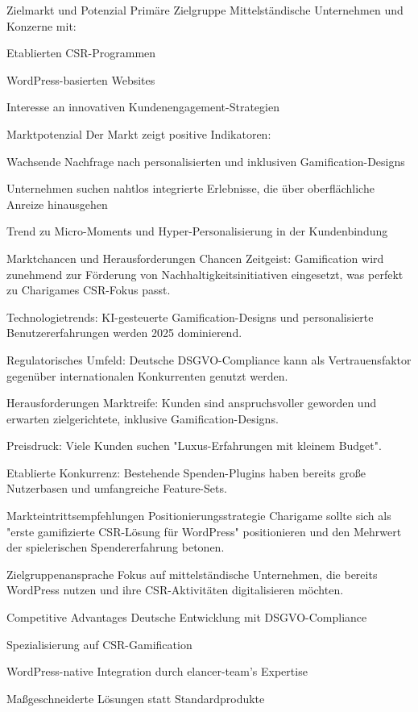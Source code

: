 Zielmarkt und Potenzial
Primäre Zielgruppe
Mittelständische Unternehmen und Konzerne mit:

Etablierten CSR-Programmen

WordPress-basierten Websites

Interesse an innovativen Kundenengagement-Strategien

Marktpotenzial
Der Markt zeigt positive Indikatoren:

Wachsende Nachfrage nach personalisierten und inklusiven Gamification-Designs

Unternehmen suchen nahtlos integrierte Erlebnisse, die über oberflächliche Anreize hinausgehen

Trend zu Micro-Moments und Hyper-Personalisierung in der Kundenbindung

Marktchancen und Herausforderungen
Chancen
Zeitgeist: Gamification wird zunehmend zur Förderung von Nachhaltigkeitsinitiativen eingesetzt, was perfekt zu Charigames CSR-Fokus passt.

Technologietrends: KI-gesteuerte Gamification-Designs und personalisierte Benutzererfahrungen werden 2025 dominierend.

Regulatorisches Umfeld: Deutsche DSGVO-Compliance kann als Vertrauensfaktor gegenüber internationalen Konkurrenten genutzt werden.

Herausforderungen
Marktreife: Kunden sind anspruchsvoller geworden und erwarten zielgerichtete, inklusive Gamification-Designs.

Preisdruck: Viele Kunden suchen "Luxus-Erfahrungen mit kleinem Budget".

Etablierte Konkurrenz: Bestehende Spenden-Plugins haben bereits große Nutzerbasen und umfangreiche Feature-Sets.

Markteintrittsempfehlungen
Positionierungsstrategie
Charigame sollte sich als "erste gamifizierte CSR-Lösung für WordPress" positionieren und den Mehrwert der spielerischen Spendererfahrung betonen.

Zielgruppenansprache
Fokus auf mittelständische Unternehmen, die bereits WordPress nutzen und ihre CSR-Aktivitäten digitalisieren möchten.

Competitive Advantages
Deutsche Entwicklung mit DSGVO-Compliance

Spezialisierung auf CSR-Gamification

WordPress-native Integration durch elancer-team's Expertise

Maßgeschneiderte Lösungen statt Standardprodukte


